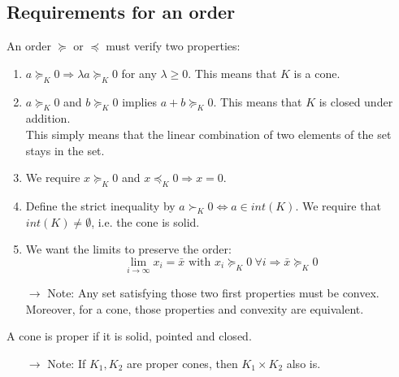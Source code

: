 \documentclass[12pt, openany]{report}
\theoremstyle{definition}
\begin{document}
\subsection{Requirements for an order}
An order $\succeq$ or $\preceq$ must verify two properties:
\begin{enumerate}
    \item $a\succeq_K0\Rightarrow \lambda a\succeq_K0$ for any $\lambda\ge 0$. This means that $K$ is a cone.
    \item $a\succeq_K0$ and $b\succeq_K0$ implies $a+b\succeq_K0$. This means that $K$ is closed under addition. \\
    
    This simply means that the linear combination of two elements of the set stays in the set.
    \item We require $x\succeq_K0$ and $x\preceq_K0\Longrightarrow x=0$.
    \item Define the strict inequality by $a\succ_K0\Leftrightarrow a\in int(K)$. We require that $int(K) \neq \emptyset$, i.e. the cone is solid.
    \item We want the limits to preserve the order:
    \begin{equation}
        \lim_{i\rightarrow \infty} x_i = \bar x \text{ with }x_i\succeq_K0 \:\forall i \Rightarrow \bar x \succeq_K0
    \end{equation}
\end{enumerate}
\begin{itemize}
    \item [$\rightarrow$] Note: Any set satisfying those two first properties must be convex. Moreover, for a cone, those properties and convexity are equivalent. 
\end{itemize}
A cone is proper if it is solid, pointed and closed. 
\begin{itemize}
    \item [$\rightarrow$] Note: If $K_1,K_2$ are proper cones, then $K_1\times K_2$ also is. 
\end{itemize}
\end{document}

